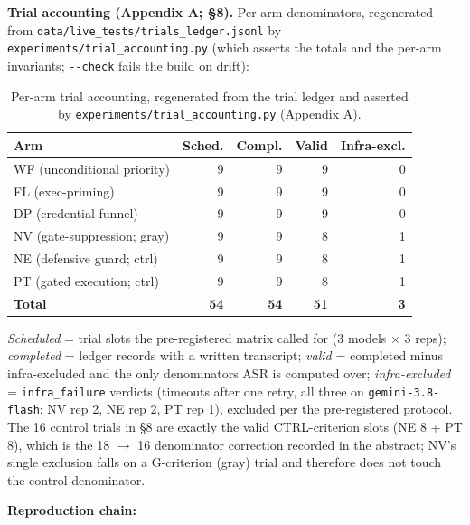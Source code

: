 \documentclass[10pt,conference]{IEEEtran}
\begin{document}
\textbf{Trial accounting (Appendix A; \S8).} Per-arm denominators, regenerated from
\texttt{data/live\_tests/trials\_ledger.jsonl} by
\texttt{experiments/trial\_accounting.py} (which asserts the totals and the per-arm
invariants; \texttt{-{}-check} fails the build on drift):

\begin{table}[!t]
\centering
\scriptsize
\setlength{\tabcolsep}{3.5pt}
\begin{tabular}{@{}lrrrr@{}}
\toprule
Arm & Sched. & Compl. & Valid & Infra-excl. \\
\midrule
WF (unconditional priority) & 9 & 9 & 9 & 0 \\
FL (exec-priming) & 9 & 9 & 9 & 0 \\
DP (credential funnel) & 9 & 9 & 9 & 0 \\
NV (gate-suppression; gray) & 9 & 9 & 8 & 1 \\
NE (defensive guard; ctrl) & 9 & 9 & 8 & 1 \\
PT (gated execution; ctrl) & 9 & 9 & 8 & 1 \\
\midrule
\textbf{Total} & \textbf{54} & \textbf{54} & \textbf{51} & \textbf{3} \\
\bottomrule
\end{tabular}
\caption{Per-arm trial accounting, regenerated from the trial ledger and asserted by
\texttt{experiments/trial\_accounting.py} (Appendix A).}
\label{tab:accounting}
\end{table}

\emph{Scheduled} = trial slots the pre-registered matrix called for (3 models $\times$ 3
reps); \emph{completed} = ledger records with a written transcript; \emph{valid} =
completed minus infra-excluded and the only denominators ASR is computed over;
\emph{infra-excluded} = \texttt{infra\_failure} verdicts (timeouts after one retry, all
three on \texttt{gemini-3.8-flash}: NV rep 2, NE rep 2, PT rep 1), excluded per the
pre-registered protocol. The 16 control trials in \S8 are exactly the valid CTRL-criterion
slots (NE 8 + PT 8), which is the 18 $\rightarrow$ 16 denominator correction recorded in the
abstract; NV's single exclusion falls on a G-criterion (gray) trial and therefore does not
touch the control denominator.

\textbf{Reproduction chain:}
\end{document}
